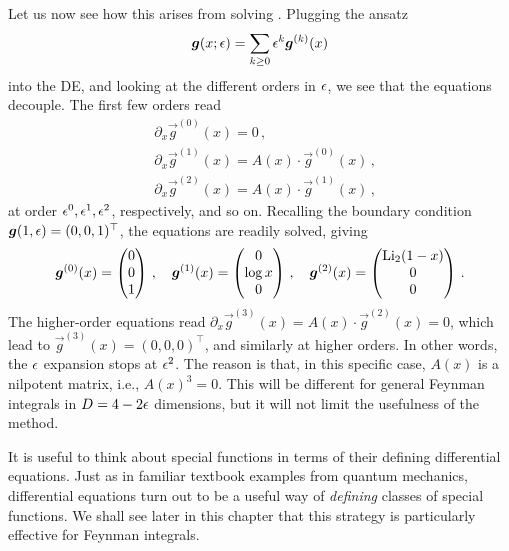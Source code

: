  Let us now see how this arises from solving . Plugging the ansatz
 \begin{align}
\vec{g}(x;\eps) = \sum_{k \ge 0} \eps^k \vec{g}^{(k)}(x) 
 \end{align}
into the DE, and looking at the different orders in $\epsilon$, we see that the equations decouple. The first few orders read 
\begin{align}\label{eq:DEgexpanded}
 & \partial_x \vec{g}^{(0)}(x) = 0 \,, \\
 &  \partial_x \vec{g}^{(1)}(x) = A(x) \cdot \vec{g}^{(0)}(x)\,,\\
 &  \partial_x \vec{g}^{(2)}(x) = A(x) \cdot \vec{g}^{(1)}(x) \,,
\end{align}
at order $\epsilon^{0}, \epsilon^{1}, \epsilon^{2}$, respectively, and so on.
Recalling the boundary condition $\vec{g}(1,\eps) = (0,0,1)^{\top}$,
the equations are readily solved, giving
 \begin{align}
 \vec{g}^{(0)}(x) = 
 \begin{pmatrix} 0 \\ 0 \\ 1 \end{pmatrix}\,,\quad
 \vec{g}^{(1)}(x) = 
 \begin{pmatrix} 0 \\ \log x \\ 0 \end{pmatrix}\,,\quad
\vec{g}^{(2)}(x) =
  \begin{pmatrix} {\rm Li}_{2}(1-x) \\ 0 \\ 0 \end{pmatrix}\,.
 \end{align}
 The higher-order equations read $ \partial_x \vec{g}^{(3)}(x) = A(x) \cdot \vec{g}^{(2)}(x)  =0 $, which lead to $\vec{g}^{(3)}(x) = (0,0,0)^{\top}$, and similarly at higher orders. In other words, the $\epsilon$ expansion stops at $\epsilon^2$. The reason is that, in this specific case, $A(x)$ is a nilpotent matrix, i.e., $A(x)^3 = 0$. 
This will be different for general Feynman integrals in $D=4-2\epsilon$ dimensions, but it will not limit the usefulness of the method.

\begin{important}{It is useful to think about special functions in terms of their defining differential equations.}
Just as in familiar textbook examples from quantum mechanics, differential equations turn out to be a useful
 way of {\it defining} classes of special functions. We shall see later in this chapter that this strategy is particularly effective for Feynman integrals.
\end{important}
 
